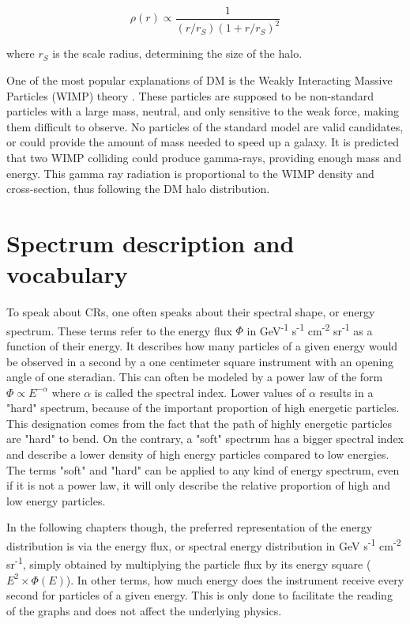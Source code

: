 \begin{equation}
\rho (r) \propto \frac{1}{\left( r/r_S \right) \left( 1 + r/r_S \right)^2 }
\end{equation}

where $r_S$ is the scale radius, determining the size of the halo. \cite{NFW1997}


One of the most popular explanations of DM is the Weakly Interacting Massive Particles (WIMP) theory \cite{Jungman1996}. These particles are supposed to be non-standard particles with a large mass, neutral, and only sensitive to the weak force, making them difficult to observe. No particles of the standard model are valid candidates, or could provide the amount of mass needed to speed up a galaxy.
It is predicted that two WIMP colliding could produce gamma-rays, providing enough mass and energy. This gamma ray radiation is proportional to the WIMP density and cross-section, thus following the DM halo distribution.

\newpage
\section{Spectrum description and vocabulary}

To speak about CRs, one often speaks about their spectral shape, or energy spectrum. These terms refer to the energy flux $\Phi$ in GeV\textsuperscript{-1} s\textsuperscript{-1} cm\textsuperscript{-2} sr\textsuperscript{-1} as a function of their energy. It describes how many particles of a given energy would be observed in a second by a one centimeter square instrument with an opening angle of one steradian. This can often be modeled by a power law of the form $\Phi \propto E^{-\alpha}$  where $\alpha$ is called the spectral index. Lower values of $\alpha$ results in a "hard" spectrum, because of the important proportion of high energetic particles. This designation comes from the fact that the path of highly energetic particles are "hard" to bend. On the contrary, a "soft" spectrum has a bigger spectral index and describe a lower density of high energy particles compared to low energies. The terms "soft" and "hard" can be applied to any kind of energy spectrum, even if it is not a power law, it will only describe the relative proportion of high and low energy particles.

In the following chapters though, the preferred representation of the energy distribution is via the energy flux, or spectral energy distribution in GeV s\textsuperscript{-1} cm\textsuperscript{-2} sr\textsuperscript{-1}, simply obtained by multiplying the particle flux by its energy square ($E^2 \times \Phi(E)$). In other terms, how much energy does the instrument receive every second for particles of a given energy. This is only done to facilitate the reading of the graphs and does not affect the underlying physics.

